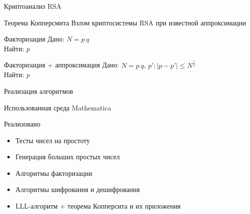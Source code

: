 \begin{frame}{Криптоанализ RSA}			

	\begin{block}{Теорема Копперсмита}
		Взлом криптосистемы RSA при известной аппроксимации
	\end{block}	 
	
	\begin{block}{Факторизация}
		Дано: $N = p \: q$ \\
		Найти: $p$
	\end{block}
	

	\begin{block}{Факторизация + аппроксимация}
		Дано: $N = p \: q$, $p': |p-p'| \le N^\frac{1}{4}$ \\
		Найти: $p$
	\end{block}		 
	
\end{frame}

\begin{frame}{Реализация алгоритмов}			

	\begin{block}{Использованная среда}
		Mathematica
	\end{block}	 
	
	\begin{block}{Реализовано}
		\begin{itemize}
	        \item Тесты чисел на простоту
	        \item Генерация больших простых чисел
	        \item Алгоритмы факторизации
	        \item Алгоритмы шифрования и дешифрования
	        \item LLL-алгоритм + теорема Копперсита и их приложения
		\end{itemize}
	\end{block}	 
	
\end{frame}